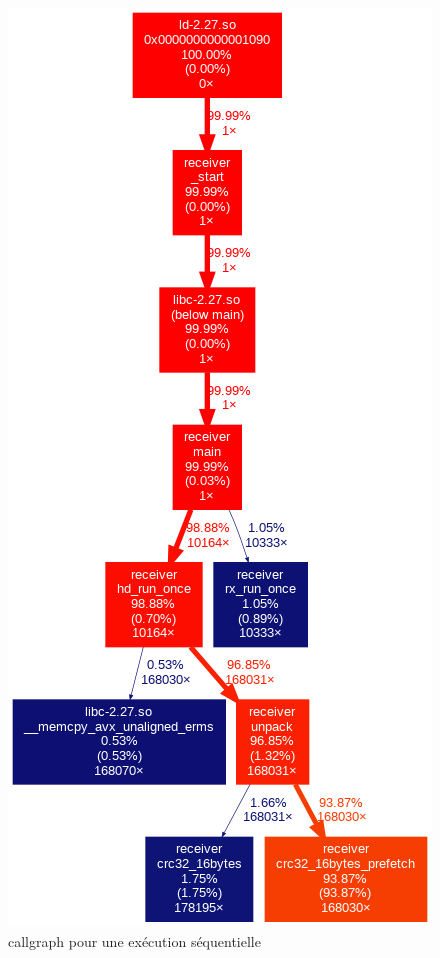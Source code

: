 \documentclass[../main.tex]{subfiles}
\begin{document}
\newpage
\begin{figure}
    \includegraphics[scale=0.6]{assets/callgraph_seq.png}
    \caption{callgraph pour une exécution séquentielle}
\end{figure}
\end{document}
